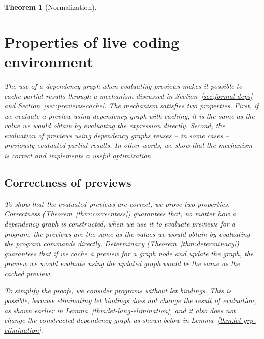 \documentclass[acmsmall,anonymous,fleqn]{acmart}\settopmatter{printfolios=false,printccs=false,printacmref=false}
\newcounter{thc}
\theoremstyle{plain}
\newtheorem{theorem}[thc]{Theorem}
\theoremstyle{definition}
\begin{document}
\begin{theorem}[Normalization]

\section{Properties of live coding environment}
\label{sec:properties}

The use of a dependency graph when evaluating previews makes it possible to cache partial results
through a mechanism discussed in Section~\ref{sec:formal-deps} and Section~\ref{sec:previews-cache}.
The mechanism satisfies two properties. First, if we evaluate a preview using dependency
graph with caching, it is the same as the value we would obtain by evaluating the expression
directly. Second, the evaluation of previews using dependency graphs reuses -- in some cases --
previously evaluated partial results. In other words, we show that the mechanism is correct
and implements a useful optimization.


\subsection{Correctness of previews}
\label{sec:properties-correct}

To show that the evaluated previews are correct, we prove two properties. Correctness
(Theorem~\ref{thm:correcntess}) guarantees that, no matter how a dependency graph is constructed,
when we use it to evaluate previews for a program, the previews are the same as the values we
would obtain by evaluating the program commands directly. Determinacy (Theorem~\ref{thm:determinacy})
guarantees that if we cache a preview for a graph node and update the graph, the preview we would
evaluate using the updated graph would be the same as the cached preview.

To simplify the proofs, we consider programs without let bindings. This is possible, because
eliminating let bindings does not change the result of evaluation, as shown earlier in
Lemma~\ref{thm:let-lang-elimination}, and it also does not change the constructed dependency graph
as shown below in Lemma~\ref{thm:let-grp-elimination}.


\end{theorem}
\end{document}

